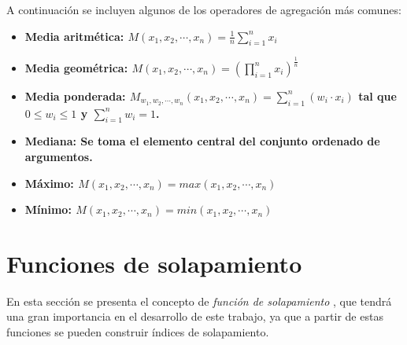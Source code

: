 A continuación se incluyen algunos de los operadores de agregación más comunes:
\begin{itemize}
	\item \bfseries Media aritmética: $M(x_{1},x_{2},\cdots,x_{n}) = \frac{1}{n}\sum\limits_{i=1}^{n}x_{i}$
	\item \bfseries Media geométrica: $M(x_{1},x_{2},\cdots,x_{n}) = (\prod\limits_{i=1}^{n}x_{i})^{\frac{1}{n}}$
	\item \bfseries Media ponderada: $M_{w_{1},w_{2},\cdots,w_{n}}(x_{1},x_{2},\cdots,x_{n}) =\sum\limits_{i=1}^{n}(w_{i}\cdot x_{i})$ \normalfont tal que $0 \leq w_{i} \leq 1$ y $\sum\limits_{i=1}^{n}w_{i} = 1$.
	\item \bfseries Mediana: \normalfont Se toma el elemento central del conjunto ordenado de argumentos.
	\item \bfseries Máximo: $M(x_{1},x_{2},\cdots,x_{n}) = max(x_{1},x_{2},\cdots,x_{n})$
	\item \bfseries Mínimo: $M(x_{1},x_{2},\cdots,x_{n}) = min(x_{1},x_{2},\cdots,x_{n})$
\end{itemize}

\section{Funciones de solapamiento}\label{sec:overlap-functions}
En esta sección se presenta el concepto de \emph{función de solapamiento} \cite{bustince2009overlap,bustince2010overlapfunctions,bustince2012pairwisecomparisons,jurio2013propertiesoverlap}, que tendrá una gran importancia en el desarrollo de este trabajo, ya que a partir de estas funciones se pueden construir índices de solapamiento.
